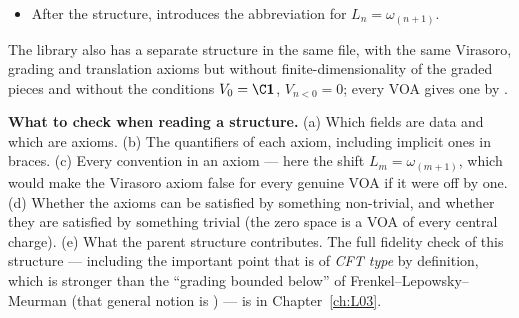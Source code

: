 \begin{example}
\begin{itemize}
  Example~\ref{ch01:ex:mode},  is $\omega_{(m+1)} = L_m$, so
  this is the Virasoro relation.  has an implicit weight ;
   uses the formal derivative ;  uses the line
  ;  and  use .
\item After the structure,  introduces the abbreviation  for
  $L_n = \omega_{(n+1)}$.
\end{itemize}
The library also has a separate structure  in the same file, with the same
Virasoro, grading and translation axioms but without finite-dimensionality of the graded pieces and
without the conditions $V_0 = \C\chonevac$, $V_{n<0}=0$; every VOA gives one by
.
\end{example}

\begin{dictionary}
\textbf{What to check when reading a structure.} (a) Which fields are data and which are axioms.
(b) The quantifiers of each axiom, including implicit ones in braces. (c) Every convention in an
axiom --- here the shift $L_m = \omega_{(m+1)}$, which would make the Virasoro axiom false for every
genuine VOA if it were off by one. (d) Whether the axioms can be satisfied by something non-trivial,
and whether they are satisfied by something trivial (the zero space is a VOA of every central
charge). (e) What the parent structure contributes. The full fidelity check of this structure ---
including the important point that  is of \emph{CFT type} by definition, which is
stronger than the ``grading bounded below'' of Frenkel--Lepowsky--Meurman (that general notion is
) --- is in Chapter~\ref{ch:L03}.
\end{dictionary}

